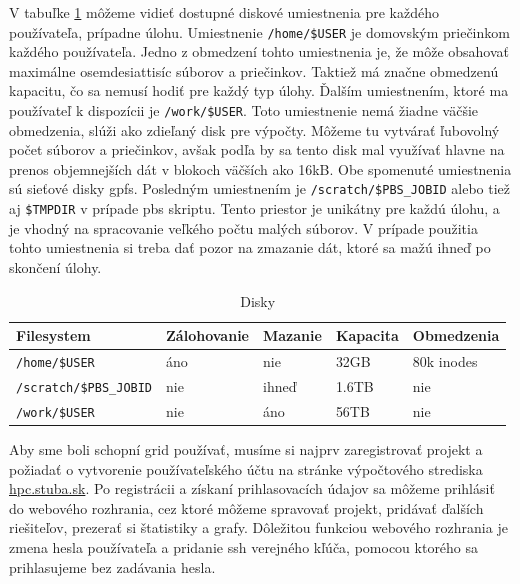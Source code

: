 V tabuľke \ref{tab:filesystem} môžeme vidieť dostupné diskové umiestnenia pre každého používateľa, prípadne úlohu.
Umiestnenie \texttt{/home/\$USER} je domovským priečinkom každého používateľa.
Jedno z obmedzení tohto umiestnenia je, že môže obsahovať maximálne osemdesiattisíc súborov a priečinkov.
Taktiež má značne obmedzenú kapacitu, čo sa nemusí hodiť pre každý typ úlohy.
Ďalším umiestnením, ktoré ma používateľ k dispozícii je \texttt{/work/\$USER}.
Toto umiestnenie nemá žiadne väčšie obmedzenia, slúži ako zdieľaný disk pre výpočty.
Môžeme tu vytvárať ľubovolný počet súborov a priečinkov, avšak podľa \cite{hpc} by sa tento disk mal využívať hlavne na prenos objemnejších dát v blokoch väčších ako 16kB. Obe spomenuté umiestnenia sú sieťové disky \acrshort{gpfs}.
Posledným umiestnením je \texttt{/scratch/\$PBS\_JOBID} alebo tiež aj \texttt{\$TMPDIR} v prípade \acrshort{pbs} skriptu.
Tento priestor je unikátny pre každú úlohu, a je vhodný na spracovanie veľkého počtu malých súborov.
V prípade použitia tohto umiestnenia si treba dať pozor na zmazanie dát, ktoré sa mažú ihneď po skončení úlohy.

\begin{table}[!h]
\centering
\begin{tabular}{@{}lllll@{}}
\toprule
\textbf{Filesystem}   & \textbf{Zálohovanie} & \textbf{Mazanie} & \textbf{Kapacita} & \textbf{Obmedzenia} \\ \midrule
\texttt{/home/\$USER}          & áno                  & nie              & 32GB              & 80k inodes          \\
\texttt{/scratch/\$PBS\_JOBID} & nie                  & ihneď            & 1.6TB             & nie                 \\
\texttt{/work/\$USER}          & nie                  & áno              & 56TB              & nie                 \\ \bottomrule
\end{tabular}
\caption{Disky}
\label{tab:filesystem}
\end{table}

Aby sme boli schopní grid používať, musíme si najprv zaregistrovať projekt a požiadať o vytvorenie
používateľského účtu na stránke výpočtového strediska \url{hpc.stuba.sk}.
Po registrácii a získaní prihlasovacích údajov sa môžeme prihlásiť do webového rozhrania, cez ktoré môžeme spravovať projekt,
pridávať ďalších riešiteľov, prezerať si štatistiky a grafy.
Dôležitou funkciou webového rozhrania je zmena hesla používateľa a pridanie \acrshort{ssh} verejného kľúča, pomocou ktorého sa prihlasujeme bez zadávania hesla.

